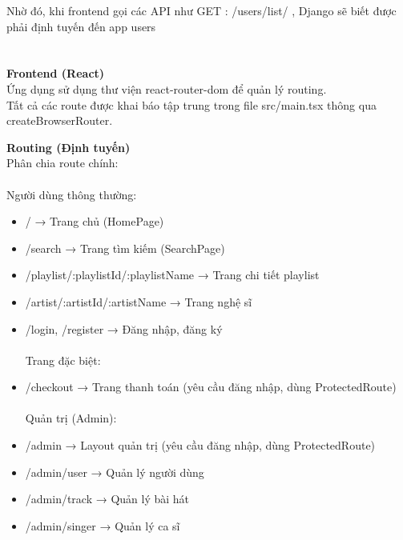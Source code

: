 \documentclass[a4paper]{article}
\begin{document}
Nhờ đó, khi frontend gọi các API như GET : 	/users/list/ , Django sẽ biết được phải định tuyến đến app users\\
\\
\\
\textbf{Frontend (React)}\\
Ứng dụng sử dụng thư viện react-router-dom để quản lý routing.\\
Tất cả các route được khai báo tập trung trong file src/main.tsx thông qua createBrowserRouter.

\textbf{Routing (Định tuyến)}
\\Phân chia route chính:
\\
\\ Người dùng thông thường:
\begin{itemize}
    \item / → Trang chủ (HomePage)
    \item /search → Trang tìm kiếm (SearchPage)
    \item /playlist/:playlistId/:playlistName → Trang chi tiết playlist
    \item /artist/:artistId/:artistName → Trang nghệ sĩ
    \item /login, /register → Đăng nhập, đăng ký
    \\
    \\ Trang đặc biệt:
    \item /checkout → Trang thanh toán (yêu cầu đăng nhập, dùng ProtectedRoute)\\
    \\
    Quản trị (Admin):
    \item /admin → Layout quản trị (yêu cầu đăng nhập, dùng ProtectedRoute)
    \item /admin/user → Quản lý người dùng
    \item /admin/track → Quản lý bài hát
    \item /admin/singer → Quản lý ca sĩ
\end{itemize}
\end{document}

